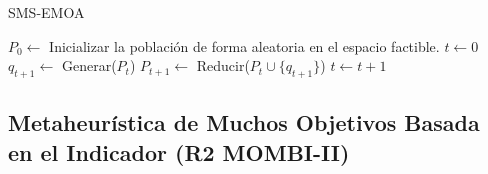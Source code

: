 \begin{algorithm}[!t]
\caption{SMS-EMOA}
\label{alg:SMSEMOA}
\begin{scriptsize}
\begin{algorithmic}[1]
	\STATE $P_0 \leftarrow $ Inicializar la población de forma aleatoria en el espacio factible.
    \STATE $t \leftarrow 0$
    	\STATE $q_{t+1} \leftarrow $ Generar($P_t$) 
        \STATE $P_{t+1} \leftarrow $ Reducir($P_t \cup \{ q_{t+1} \} $) 
    	\STATE $t \leftarrow t+1$
    \ENDWHILE
\end{algorithmic}
\end{scriptsize}
\end{algorithm}

\subsection{Metaheurística de Muchos Objetivos Basada en el Indicador (R2 MOMBI-II)}


